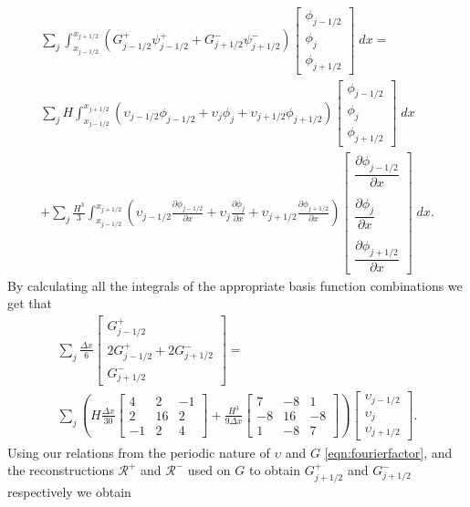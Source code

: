   \begin{multline*}
  \sum_j \int_{x_{j-1/2}}^{x_{j + 1/2}} \left(G^+_{j-1/2}\psi^+_{j - 1/2} + G^-_{j+1/2}\psi^-_{j + 1/2}\right) \begin{bmatrix}
  \phi_{j-1/2}\\\phi_j \\\phi_{j+1/2}
  \end{bmatrix}  \; dx= \\   \sum_j H\int_{x_{j-1/2}}^{x_{j + 1/2}} \left(\upsilon_{j-1/2}\phi_{j - 1/2} + \upsilon_{j}\phi_{j}+ \upsilon_{j+1/2}\phi_{j + 1/2}\right) \begin{bmatrix}
  \phi_{j-1/2}\\\phi_j \\\phi_{j+1/2}
  \end{bmatrix}  \; dx \\ + 
  \sum_j \frac{H^3}{3}\int_{x_{j-1/2}}^{x_{j + 1/2}} \left(\upsilon_{j-1/2} \frac{\partial \phi_{j - 1/2} }{\partial x} + \upsilon_{j}\frac{\partial \phi_{j} }{\partial x}+ \upsilon_{j+1/2}\frac{\partial \phi_{j + 1/2} }{\partial x}\right) \begin{bmatrix}
  \dfrac{\partial \phi_{j - 1/2} }{\partial x}\\ \\\dfrac{\partial \phi_{j} }{\partial x}\\ \\\dfrac{\partial \phi_{j + 1/2} }{\partial x}   \end{bmatrix} \; dx.
  \end{multline*}
 By calculating all the integrals of the appropriate basis function combinations we get that 
 \begin{multline*}
 \sum_j \frac{\Delta x}{6}\begin{bmatrix} G^+_{j -1/2} \\2 G^+_{j -1/2}+2 G^-_{j +1/2} \\ G^-_{j +1/2} \end{bmatrix} = \\\sum_j \left(H\frac{\Delta x}{30}\begin{bmatrix} 4 &2 &-1 \\2 &16 &2  \\-1 &2 &4 \end{bmatrix} + \frac{H^3 }{9\Delta x}\begin{bmatrix} 7 &-8 &1  \\-8 &16 &-8  \\1 &-8 &7  \end{bmatrix} \right) \begin{bmatrix} \upsilon_{j -1/2} \\\upsilon_{j} \\ \upsilon_{j +1/2} \end{bmatrix}.
 \end{multline*} 
 Using our relations from the periodic nature of $\upsilon$ and $G$ \eqref{eqn:fourierfactor}, and the reconstructions $\mathcal{R}^+$ and $\mathcal{R}^-$ used on $G$ to obtain $G^+_{j +1/2}$ and $G^-_{j +1/2}$ respectively we obtain
 
